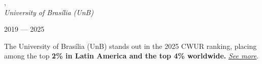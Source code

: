 , \\  
\textit{University of Brasília (UnB)}\strut \hfill 2019 --- 2025\\  

\vspace*{7pt}  

The University of Brasília (UnB) stands out in the 2025 CWUR ranking, placing among the top \textbf{2\% in Latin America and the top 4\% worldwide.}
\href{https://cwur.org/2025/university-of-brasilia.php}{ \textit{See more}}.

